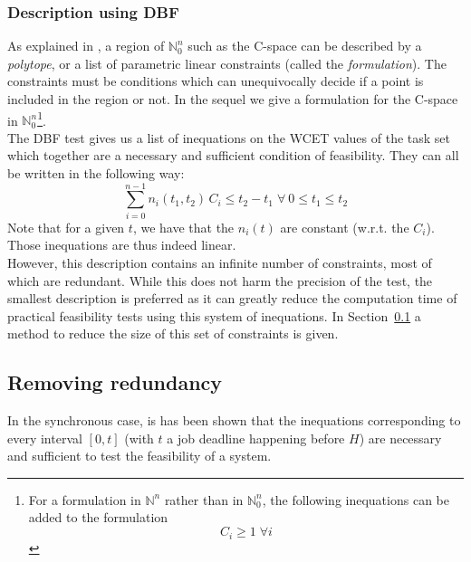 \documentclass[times, 10pt,twocolumn, a4paper]{article}
\begin{document}

		\subsubsection{Description using DBF}
			\label{sct:cspaceDescr}

			As explained in \cite{nemhauser1988integer}, a region of $\mathbb{N}_0^n$ such as the C-space can be described by a \emph{polytope}, or a list of parametric linear constraints (called the \emph{formulation}). The constraints must be conditions which can unequivocally decide if a point is included in the region or not. In the sequel we give a formulation for the C-space in $\mathbb{N}_0^n$\footnote{For a formulation in $\mathbb{N}^n$ rather than in $\mathbb{N}_0^n$, the following inequations can be added to the formulation \[ C_i \geqslant 1 \; \forall i \]}.\\

			The DBF test gives us a list of inequations on the WCET values of the task set which together are a necessary and sufficient condition of feasibility. They can all be written in the following way:
			\[
				\sum_{i=0}^{n-1} n_i(t_1, t_2) \, C_i \leq t_2 - t_1 \; \forall \: 0 \leq
				t_1 \leq t_2
			\]
			Note that for a given $t$, we have that the $n_i(t)$ are
			constant (w.r.t. the $C_i$). Those inequations are thus indeed linear.\\

			However, this description contains an infinite number of constraints, most of
			which are redundant. While this does not harm the precision of the
			test, the smallest description is preferred as it can greatly
			reduce the computation time of practical feasibility tests using this system
			of inequations. In Section~\ref{sct:removeRedundancy} a method to reduce the size of this set of constraints is given.

	\subsection{Removing redundancy}
		\label{sct:removeRedundancy}

	In the synchronous case, is has been shown that the inequations corresponding
	to every interval $[0, t]$ (with $t$ a job deadline happening before $H$) are
	necessary and sufficient to test the feasibility of a system.\\
\end{document}
